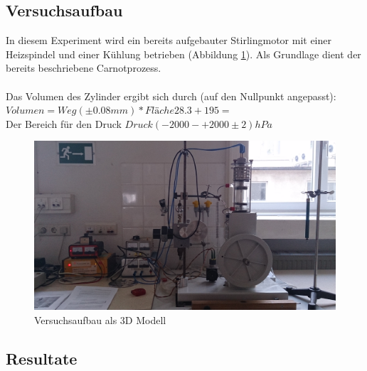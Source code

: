\documentclass[12pt,a4paper]{article}
\begin{document}
\begin{multicols}{2}
\subsection{Versuchsaufbau}
In diesem Experiment wird ein bereits aufgebauter Stirlingmotor mit einer Heizspindel und einer Kühlung betrieben (Abbildung  \ref{fig:stirlingMotor_3D}). Als Grundlage dient der bereits beschriebene Carnotprozess. \\
\\
Das Volumen des Zylinder ergibt sich durch (auf den Nullpunkt angepasst):\\
$Volumen = Weg (\pm 0.08mm) * Fläche 28.3 + 195 = $\\ %
Der Bereich für den Druck
$Druck (-2000 - +2000 \pm 2) hPa$\\


\begin{figure}[H]
	\centering
	\includegraphics[scale=0.05]{./data/3D-Model_Images/DSC_0083.JPG}
	\caption{Versuchsaufbau als 3D Modell}
	\label{fig:stirlingMotor_3D}
\end{figure}

\subsection{Resultate}


\end{multicols}
\end{document}

